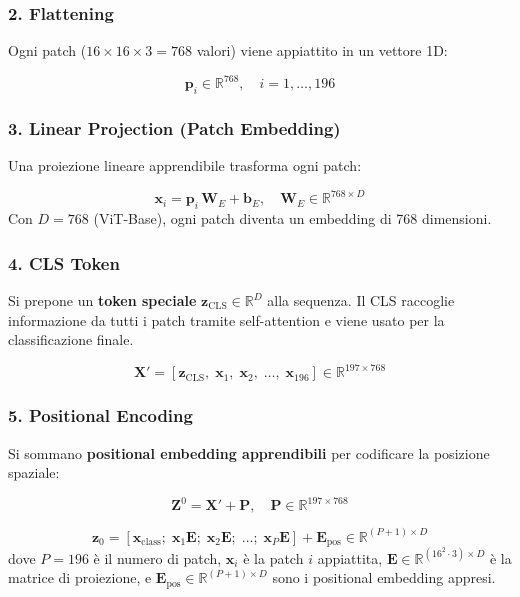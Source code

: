 \documentclass[
  11pt,
]{article}
\begin{document}
\subsubsection{2. Flattening}
Ogni patch ($16 \times 16 \times 3 = 768$ valori) viene appiattito in un vettore 1D:

\[
\mathbf{p}_i \in \mathbb{R}^{768}, \quad i = 1, \ldots, 196
\]

\subsubsection{3. Linear Projection (Patch Embedding)}
Una proiezione lineare apprendibile trasforma ogni patch:

\[
\mathbf{x}_i = \mathbf{p}_i\,\mathbf{W}_E + \mathbf{b}_E, \quad \mathbf{W}_E \in \mathbb{R}^{768 \times D}
\]
Con $D = 768$ (ViT-Base), ogni patch diventa un embedding di 768 dimensioni.

\subsubsection{4. CLS Token}
Si prepone un \textbf{token speciale} $\mathbf{z}_{\text{CLS}} \in \mathbb{R}^{D}$ alla sequenza. Il CLS raccoglie informazione da tutti i patch tramite self-attention e viene usato per la classificazione finale.

\[
\mathbf{X}' = [\mathbf{z}_{\text{CLS}},\; \mathbf{x}_1,\; \mathbf{x}_2,\; \ldots,\; \mathbf{x}_{196}] \in \mathbb{R}^{197 \times 768}
\]

\subsubsection{5. Positional Encoding}
Si sommano \textbf{positional embedding apprendibili} per codificare la posizione spaziale:

\[
\mathbf{Z}^0 = \mathbf{X}' + \mathbf{P}, \quad \mathbf{P} \in \mathbb{R}^{197 \times 768}
\]

\begin{formulabox}[title={\textbf{Formula compatta del ViT}}]
\[
\mathbf{z}_0 = [\mathbf{x}_{\text{class}};\; \mathbf{x}_1\mathbf{E};\; \mathbf{x}_2\mathbf{E};\; \ldots;\; \mathbf{x}_P\mathbf{E}] + \mathbf{E}_{\text{pos}} \in \mathbb{R}^{(P+1) \times D}
\]
dove $P = 196$ è il numero di patch, $\mathbf{x}_i$ è la patch $i$ appiattita, $\mathbf{E} \in \mathbb{R}^{(16^2 \cdot 3) \times D}$ è la matrice di proiezione, e $\mathbf{E}_{\text{pos}} \in \mathbb{R}^{(P+1) \times D}$ sono i positional embedding appresi.
\end{formulabox}
\end{document}
